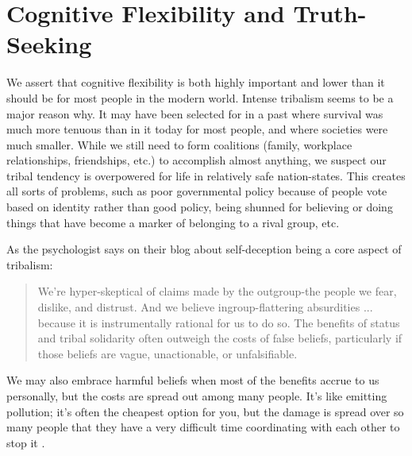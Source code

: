 \documentclass[12pt,letterpaper]{book}
\begin{document}
\section{Cognitive Flexibility and Truth-Seeking}
We assert that cognitive flexibility is both highly important and lower than it should be for most people in the modern world. Intense tribalism seems to be a major reason why. It may have been selected for in a past where survival was much more tenuous than in it today for most people, and where societies were much smaller. While we still need to form coalitions (family, workplace relationships, friendships, etc.) to accomplish almost anything, we suspect our tribal tendency is overpowered for life in relatively safe nation-states. This creates all sorts of problems, such as poor governmental policy because of people vote based on identity \cite{klein2020Polarized} rather than good policy, being shunned for believing or doing things that have become a marker of belonging to a rival group, etc.

As the psychologist \textcite{pinsof2024Truth} says on their blog about self-deception being a core aspect of tribalism:
\begin{quotation}
	We're hyper-skeptical of claims made by the outgroup-the people we fear, dislike, and distrust. And we believe ingroup-flattering absurdities ... because it is instrumentally rational for us to do so. The benefits of status and tribal solidarity often outweigh the costs of false beliefs, particularly if those beliefs are vague, unactionable, or unfalsifiable.
\end{quotation}
We may also embrace harmful beliefs when most of the benefits accrue to us personally, but the costs are spread out among many people. It's like emitting pollution; it's often the cheapest option for you, but the damage is spread over so many people that they have a very difficult time coordinating with each other to stop it \cite{coaseTheorem}.
\end{document}
